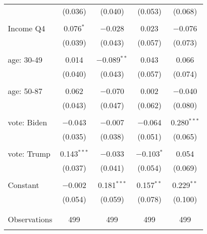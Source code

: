 \begin{tabular}{@{\extracolsep{5pt}}lcccc}
  & (0.036) & (0.040) & (0.053) & (0.068) \\ 
  & & & & \\ 
 Income Q4 & 0.076$^{*}$ & $-$0.028 & 0.023 & $-$0.076 \\ 
  & (0.039) & (0.043) & (0.057) & (0.073) \\ 
  & & & & \\ 
 age: 30-49 & 0.014 & $-$0.089$^{**}$ & 0.043 & 0.066 \\ 
  & (0.040) & (0.043) & (0.057) & (0.074) \\ 
  & & & & \\ 
 age: 50-87 & 0.062 & $-$0.070 & 0.002 & $-$0.040 \\ 
  & (0.043) & (0.047) & (0.062) & (0.080) \\ 
  & & & & \\ 
 vote: Biden & $-$0.043 & $-$0.007 & $-$0.064 & 0.280$^{***}$ \\ 
  & (0.035) & (0.038) & (0.051) & (0.065) \\ 
  & & & & \\ 
 vote: Trump & 0.143$^{***}$ & $-$0.033 & $-$0.103$^{*}$ & 0.054 \\ 
  & (0.037) & (0.041) & (0.054) & (0.069) \\ 
  & & & & \\ 
 Constant & $-$0.002 & 0.181$^{***}$ & 0.157$^{**}$ & 0.229$^{**}$ \\ 
  & (0.054) & (0.059) & (0.078) & (0.100) \\ 
  & & & & \\ 
\hline \\[-1.8ex] 

Observations & 499 & 499 & 499 & 499 \\ 
\hline 
\hline \\[-1.8ex] 
\end{tabular} 